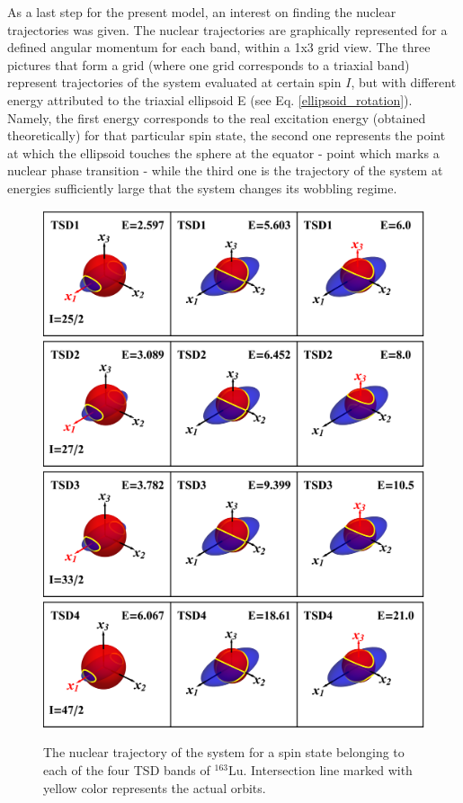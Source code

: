 \documentclass[%
 reprint,
 amsmath,
 amssymb,
 aps,
 floatfix,
]{revtex4-2}
\begin{document}
As a last step for the present model, an interest on finding the nuclear trajectories was given. The nuclear trajectories are graphically represented for a defined angular momentum for each band, within a 1x3 grid view. The three pictures that form a grid (where one grid corresponds to a triaxial band) represent trajectories of the system evaluated at certain spin $I$, but with different energy attributed to the triaxial ellipsoid E (see Eq. \ref{ellipsoid_rotation}). Namely, the first energy corresponds to the real excitation energy (obtained theoretically) for that particular spin state, the second one represents the point at which the ellipsoid touches the sphere at the equator - point which marks a nuclear phase transition - while the third one is the trajectory of the system at energies sufficiently large that the system changes its wobbling regime.

\begin{figure}
    \centering
    \includegraphics[scale=0.55]{images/tsd1_spin1.eps}
    \includegraphics[scale=0.55]{images/tsd2_spin1.eps}
    \includegraphics[scale=0.55]{images/tsd3_spin1.eps}
    \includegraphics[scale=0.55]{images/tsd4_spin1.eps}
    \caption{The nuclear trajectory of the system for a spin state belonging to each of the four TSD bands of $^{163}$Lu. Intersection line marked with yellow color represents the actual orbits.}
    \label{ellipsoids-tsd1}
\end{figure}
\end{document}
